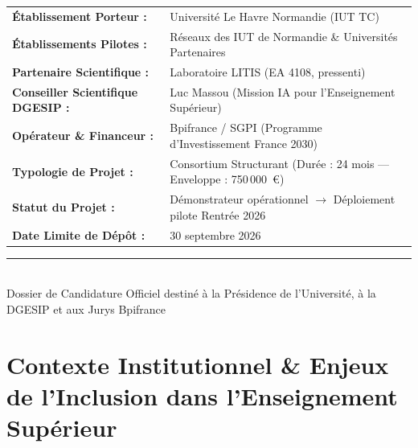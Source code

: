\documentclass[11pt,a4paper]{article}
\begin{document}
\begin{titlepage}
    \vspace{0.6cm}

    \begin{minipage}{0.92\textwidth}
    \small
    \begin{tabularx}{\textwidth}{l X}
        \textbf{Établissement Porteur :} & Université Le Havre Normandie (IUT TC) \\
        \textbf{Établissements Pilotes :} & Réseaux des IUT de Normandie \& Universités Partenaires \\
        \textbf{Partenaire Scientifique :} & Laboratoire LITIS (EA 4108, pressenti) \\
        \textbf{Conseiller Scientifique DGESIP :} & Luc Massou (Mission IA pour l'Enseignement Supérieur) \\
        \textbf{Opérateur \& Financeur :} & Bpifrance / SGPI (Programme d'Investissement France 2030) \\
        \textbf{Typologie de Projet :} & Consortium Structurant (Durée : 24 mois --- Enveloppe : 750\,000~€) \\
        \textbf{Statut du Projet :} & Démonstrateur opérationnel $\rightarrow$ Déploiement pilote Rentrée 2026 \\
        \textbf{Date Limite de Dépôt :} & 30 septembre 2026 \\
    \end{tabularx}
    \end{minipage}

    \vfill
    \rule{\textwidth}{0.6pt}\\[0.2cm]
    {\footnotesize\color{gray} Dossier de Candidature Officiel destiné à la Présidence de l'Université, à la DGESIP et aux Jurys Bpifrance}
\end{titlepage}

\newpage
{}
\vspace*{0.5cm}
\tableofcontents
\thispagestyle{fancy}
\vfill

\newpage
\section{Contexte Institutionnel \& Enjeux de l'Inclusion dans l'Enseignement Supérieur}
\end{document}
